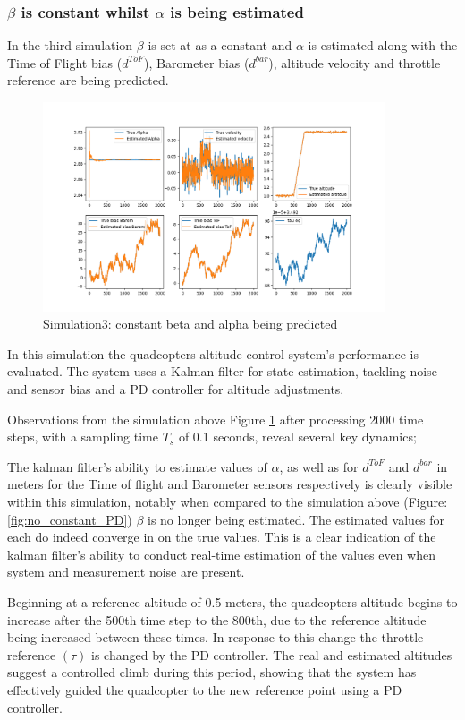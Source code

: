 \documentclass{report}
\begin{document}
\subsubsection*{\(\beta\) is constant whilst \(\alpha\) is being estimated}
In the third simulation \(\beta\) is set at as a constant and \(\alpha\) is
estimated along with the Time of Flight bias (\(d^{ToF}\)), Barometer bias
(\(d^{bar}\)), altitude velocity and throttle reference are being predicted.
\begin{figure}[H]
  \centering
  \includegraphics[width=0.9\textwidth]{Pictures/b_constant_PD.png}
  \caption{Simulation3: constant beta and alpha being predicted}
  \label{fig:b_constant_PD}
\end{figure}
In this simulation the quadcopters altitude control system's performance is
evaluated. The system uses a Kalman filter for state estimation, tackling noise
and sensor bias and a PD controller for altitude adjustments.

Observations from the simulation above Figure \ref{fig:b_constant_PD} after
processing 2000 time steps, with a sampling time \(T_s\) of 0.1 seconds, reveal
several key dynamics;

The kalman filter’s ability to estimate values of \(\alpha\), as well as for
\(d^{ToF}\) and \(d^{bar}\) in meters for the Time of flight and Barometer
sensors respectively is clearly visible within this simulation, notably when
compared to the simulation above (Figure:\ref{fig:no_constant_PD}) \(\beta\) is
no longer being estimated. The estimated values for each do indeed converge in
on the true values. This is a clear indication of the kalman filter’s ability to
conduct real-time estimation of the values even when system and measurement
noise are present.

Beginning at a reference altitude of 0.5 meters, the quadcopters altitude begins
to increase after the 500th time step to the 800th, due to the reference
altitude being increased between these times. In response to this change the
throttle reference \((\tau)\) is changed by the PD controller. The real and
estimated altitudes suggest a controlled climb during this period, showing that
the system has effectively guided the quadcopter to the new reference point
using a PD controller.
\end{document}
